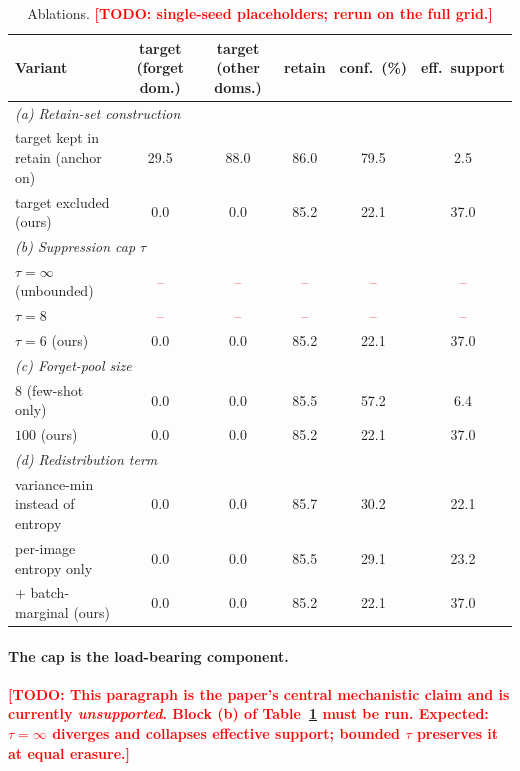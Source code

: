 \documentclass[10pt]{article}
\newcommand{\todo}[1]{\textcolor{red}{\textbf{[TODO: #1]}}}
\newcommand{\pending}{\textcolor{red}{--}}
\begin{document}
\begin{table}[t]
\centering
\caption{Ablations. \todo{single-seed placeholders; rerun on the full grid.}}
\label{tab:ablation}
\small
\begin{tabular}{lccccc}
\toprule
Variant & target (forget dom.) & target (other doms.) & retain
& conf.\ (\%) & eff.\ support \\
\midrule
\multicolumn{6}{l}{\emph{(a) Retain-set construction}}\\
\quad target kept in retain (anchor on) & 29.5 & 88.0 & 86.0 & 79.5 & 2.5 \\
\quad target excluded (ours)            & 0.0  & 0.0  & 85.2 & 22.1 & 37.0 \\
\midrule
\multicolumn{6}{l}{\emph{(b) Suppression cap $\tau$}}\\
\quad $\tau = \infty$ (unbounded)       & \pending & \pending & \pending & \pending & \pending \\
\quad $\tau = 8$                        & \pending & \pending & \pending & \pending & \pending \\
\quad $\tau = 6$ (ours)                 & 0.0 & 0.0 & 85.2 & 22.1 & 37.0 \\
\midrule
\multicolumn{6}{l}{\emph{(c) Forget-pool size}}\\
\quad $8$ (few-shot only)               & 0.0 & 0.0 & 85.5 & 57.2 & 6.4 \\
\quad $100$ (ours)                      & 0.0 & 0.0 & 85.2 & 22.1 & 37.0 \\
\midrule
\multicolumn{6}{l}{\emph{(d) Redistribution term}}\\
\quad variance-min instead of entropy   & 0.0 & 0.0 & 85.7 & 30.2 & 22.1 \\
\quad per-image entropy only            & 0.0 & 0.0 & 85.5 & 29.1 & 23.2 \\
\quad + batch-marginal (ours)           & 0.0 & 0.0 & 85.2 & 22.1 & 37.0 \\
\bottomrule
\end{tabular}
\end{table}

\paragraph{The cap is the load-bearing component.} \todo{This paragraph is the
paper's central mechanistic claim and is currently \emph{unsupported}. Block (b)
of Table~\ref{tab:ablation} must be run. Expected: $\tau=\infty$ diverges and
collapses effective support; bounded $\tau$ preserves it at equal erasure.}
\end{document}
